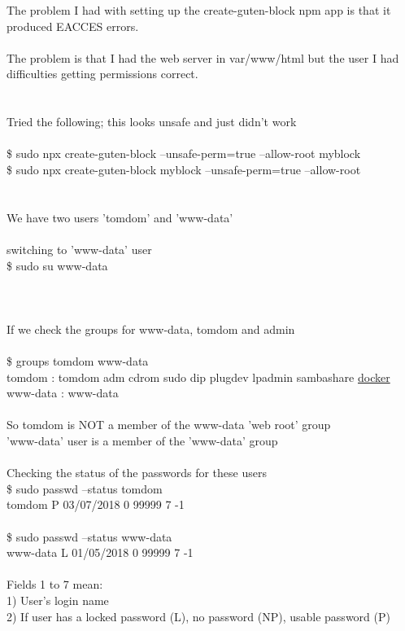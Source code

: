 \documentclass[10pt,a4paper]{article}
\begin{document}
{{{{{{{{{{{{{{{{{{{{{The problem I had with setting up the create-guten-block npm app is that it produced EACCES errors.\\
\\
The problem is that I had the web server in var/www/html but the user I had difficulties getting permissions correct.\\
\\
\\
Tried the following; this looks unsafe and just didn't work\\
\\
\$ sudo npx create-guten-block --unsafe-perm=true --allow-root myblock\\
\$ sudo npx create-guten-block myblock --unsafe-perm=true --allow-root\\
\\
\\
We have two users 'tomdom' and 'www-data'\\
\\
switching to 'www-data' user\\
\$ sudo su www-data\\
\\
\\
\\
If we check the groups for www-data, tomdom and admin\\
\\
\$ groups tomdom www-data\\
tomdom : tomdom adm cdrom sudo dip plugdev lpadmin sambashare \hyperlink{docker}{docker}}{\large \\
www-data : www-data\\
\\
So tomdom is NOT a member of the www-data 'web root' group\\
'www-data' user is a member of the 'www-data' group\\
\\
Checking the status of the passwords for these users\\
\$ sudo passwd --status tomdom\\
tomdom P 03/07/2018 0 99999 7 -1\\
\\
\$ sudo passwd --status www-data\\
www-data L 01/05/2018 0 99999 7 -1\\
\\
Fields 1 to 7 mean:\\
1) User's login name\\
2) If user has a locked password (L), no password (NP), usable password (P)\\
}}}}}}}}}}}}}}}}}}}}}
\end{document}
